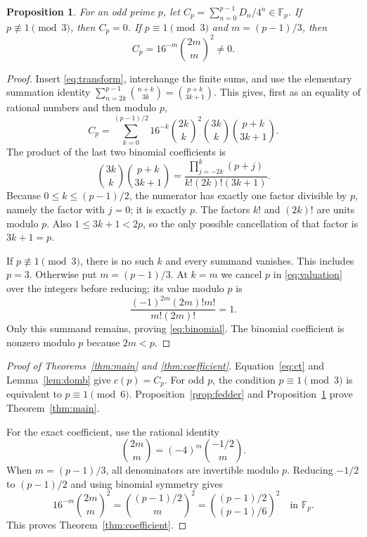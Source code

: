\documentclass[11pt]{article}
\newtheorem{proposition}[theorem]{Proposition}
\theoremstyle{remark}\newtheorem{remark}[theorem]{Remark}
\newcommand{\F}{\mathbb F}
\numberwithin{equation}{section}
\begin{document}
\begin{proposition}\label{prop:sum}
For an odd prime $p$, let $C_p=\sum_{n=0}^{p-1}D_n/4^n\in\F_p$.
If $p\not\equiv1\pmod3$, then $C_p=0$. If $p\equiv1\pmod3$ and
$m=(p-1)/3$, then
\begin{equation}\label{eq:binomial}
 C_p=16^{-m}\binom{2m}{m}^{\!2}\ne0.
\end{equation}
\end{proposition}
\begin{proof}
Insert \eqref{eq:transform}, interchange the finite sums, and use
the elementary summation identity
$\sum_{n=2k}^{p-1}\binom{n+k}{3k}=\binom{p+k}{3k+1}$.
This gives, first as an equality of rational numbers and then modulo
$p$,
\begin{equation}\label{eq:finiteouter}
 C_p=\sum_{k=0}^{(p-1)/2}16^{-k}\binom{2k}{k}^{\!2}
                  \binom{3k}{k}\binom{p+k}{3k+1}.
\end{equation}
The product of the last two binomial coefficients is
\begin{equation}\label{eq:valuation}
 \binom{3k}{k}\binom{p+k}{3k+1}
 =\frac{\prod_{j=-2k}^{k}(p+j)}{k!(2k)!(3k+1)}.
\end{equation}
Because $0\le k\le(p-1)/2$, the numerator has exactly one factor
divisible by $p$, namely the factor with $j=0$; it is exactly $p$.
The factors $k!$ and $(2k)!$ are units modulo $p$. Also
$1\le3k+1<2p$, so the only possible cancellation of that factor
is $3k+1=p$.

If $p\not\equiv1\pmod3$, there is no such $k$ and every summand
vanishes. This includes $p=3$. Otherwise put $m=(p-1)/3$. At
$k=m$ we cancel $p$ in \eqref{eq:valuation} over the integers before
reducing; its value modulo $p$ is
\[
 \frac{(-1)^{2m}(2m)!m!}{m!(2m)!}=1.
\]
Only this summand remains, proving \eqref{eq:binomial}. The binomial
coefficient is nonzero modulo $p$ because $2m<p$.
\end{proof}

\begin{proof}[Proof of Theorems~\ref{thm:main} and \ref{thm:coefficient}]
Equation~\eqref{eq:ct} and Lemma~\ref{lem:domb} give $c(p)=C_p$.
For odd $p$, the condition $p\equiv1\pmod3$ is equivalent to
$p\equiv1\pmod6$. Proposition~\ref{prop:fedder} and
Proposition~\ref{prop:sum} prove Theorem~\ref{thm:main}.

For the exact coefficient, use the rational identity
\[
 \binom{2m}{m}=(-4)^m\binom{-1/2}{m}.
\]
When $m=(p-1)/3$, all denominators are invertible modulo $p$.
Reducing $-1/2$ to $(p-1)/2$ and using binomial symmetry gives
\[
 16^{-m}\binom{2m}{m}^{\!2}
 =\binom{(p-1)/2}{m}^{\!2}
 =\binom{(p-1)/2}{(p-1)/6}^{\!2}\quad\text{in }\F_p.
\]
This proves Theorem~\ref{thm:coefficient}.
\end{proof}
\end{document}

